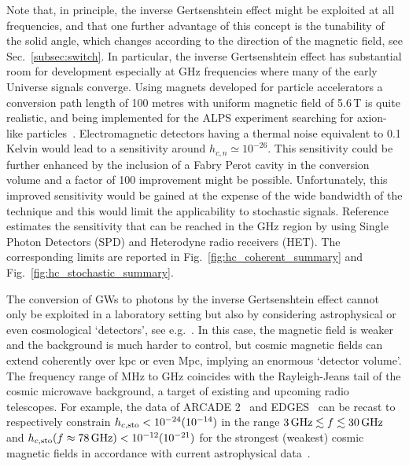 \documentclass[11pt,a4paper]{article}
\begin{document}
Note that, in principle, the inverse Gertsenshtein effect might be exploited at all frequencies, and that one further advantage of this concept is the tunability of the solid angle, which changes according to the direction of the magnetic field, see Sec.~\ref{subsec:switch}. In particular, the inverse Gertsenshtein effect has substantial room for development especially at GHz frequencies where many of the early Universe signals converge. Using magnets developed for particle accelerators a conversion path length of 100 metres with uniform magnetic field of 5.6\,T is quite realistic, and being implemented for the ALPS experiment searching for axion-like particles~\cite{Bahre:2013ywa}. Electromagnetic detectors having a thermal noise equivalent to 0.1 Kelvin would lead to a sensitivity around $h_{c,n} \simeq 10^{-26}$. This sensitivity could be further enhanced by the inclusion of a Fabry Perot cavity in the conversion volume and a factor of 100 improvement might be possible. Unfortunately, this improved sensitivity would be gained at the expense of the wide bandwidth of the technique and this would limit the applicability to stochastic signals. Reference~\cite{Ringwald:2020ist} estimates the sensitivity that can be reached in the GHz region by using Single Photon Detectors (SPD) and Heterodyne radio receivers (HET). The corresponding limits are reported in Fig.~\ref{fig:hc_coherent_summary} and Fig.~\ref{fig:hc_stochastic_summary}.

The conversion of GWs to photons by the inverse Gertsenshtein effect cannot only be exploited in a laboratory setting but also by considering astrophysical or even cosmological `detectors', see e.g.~\cite{Pshirkov:2009sf, PhysRevLett.74.634, Dolgov:2012be, Cillis:1996qy,Domcke:2020yzq}. In this case, the magnetic field is weaker and the background is much harder to control, but cosmic magnetic fields can extend coherently over kpc or even Mpc, implying an enormous `detector volume'. The frequency range of MHz to GHz coincides with the Rayleigh-Jeans tail of the cosmic microwave background, a target of existing and upcoming radio telescopes. For example, the data of ARCADE 2~\cite{Fixsen_2011} and EDGES~\cite{Bowman:2018yin} can be recast to respectively constrain $h_{c,\rm sto} < 10^{-24}  (10^{-14})$ in the range $3 \, {\rm GHz} \lesssim f  \lesssim 30 \, {\rm GHz}$ and $h_{c, \rm sto}(f \approx 78 \, {\rm GHz}) < 10^{-12} (10^{-21})$ for the strongest (weakest) cosmic magnetic fields in accordance with current astrophysical data~\cite{Domcke:2020yzq}.
\end{document}
